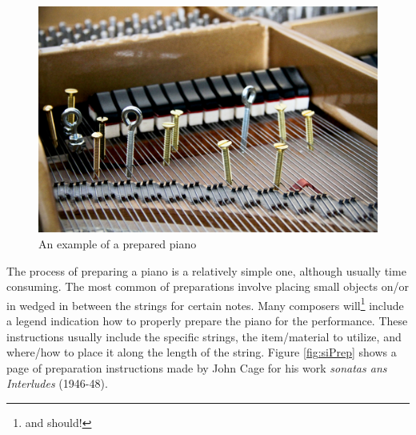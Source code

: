 \begin{figure}
    \centering
    \includegraphics[scale=0.2]{diagrams/IMG_9734_1.jpg}
    \caption{An example of a prepared piano} %
    \label{fig:pp}
\end{figure}

The process of preparing a piano is a relatively simple one, although usually time consuming. The most common of preparations involve placing small objects on/or in wedged in between the strings for certain notes. Many composers will\footnote{and should!} include a legend indication how to properly prepare the piano for the performance. These instructions usually include the specific strings, the item/material to utilize, and where/how to place it along the length of the string. Figure \ref{fig:siPrep} shows a page of preparation instructions made by John Cage for his work \textit{sonatas ans Interludes} (1946-48).


